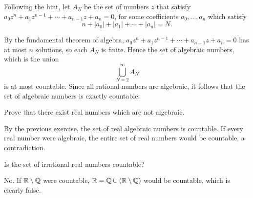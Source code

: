 \begin{solution}
Following the hint, let $A_N$ be the set of numbers $z$ that satisfy $a_0z^n+a_1z^{n-1}+\cdots+a_{n-1}z+a_n=0$, for some coefficients $a_0,\dots,a_n$ which satisfy
\[n+|a_0|+|a_1|+\cdots+|a_n|=N.\]

By the fundamental theorem of algebra, $a_0z^n+a_1z^{n-1}+\cdots+a_{n-1}z+a_n=0$ has at most $n$ solutions, so each $A_N$ is finite. Hence the set of algebraic numbers, which is the union
\[\bigcup_{N=2}^{\infty}A_N\]
is at most countable. Since all rational numbers are algebraic, it follows that the set of algebraic numbers is exactly countable. 
\end{solution}

\begin{exercise}
Prove that there exist real numbers which are not algebraic.
\end{exercise}

\begin{solution}
By the previous exercise, the set of real algebraic numbers is countable. If every real number were algebraic, the entire set of real numbers would be countable, a contradiction.
\end{solution}

\begin{exercise}
Is the set of irrational real numbers countable?
\end{exercise}

\begin{solution}
No. If $\mathbb R\setminus\mathbb Q$ were countable, $\mathbb R=\mathbb Q\cup(\mathbb R\setminus\mathbb Q)$ would be countable, which is clearly false.
\end{solution}